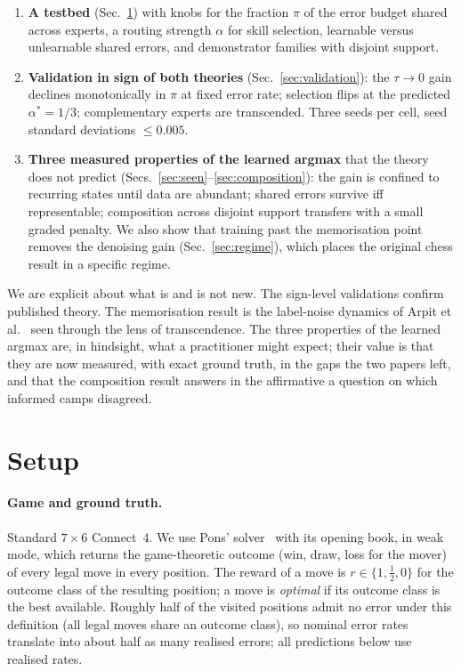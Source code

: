 \documentclass[11pt]{article}
\newcommand{\tauz}{\tau\!\to\!0}
\begin{document}
\begin{enumerate}
\item \textbf{A testbed} (Sec.~\ref{sec:setup}) with knobs for the fraction $\pi$ of the error budget shared across experts, a routing strength $\alpha$ for skill selection, learnable versus unlearnable shared errors, and demonstrator families with disjoint support.
\item \textbf{Validation in sign of both theories} (Sec.~\ref{sec:validation}): the $\tauz$ gain declines monotonically in $\pi$ at fixed error rate; selection flips at the predicted $\alpha^*=1/3$; complementary experts are transcended. Three seeds per cell, seed standard deviations $\le 0.005$.
\item \textbf{Three measured properties of the learned argmax} that the theory does not predict (Secs.~\ref{sec:seen}--\ref{sec:composition}): the gain is confined to recurring states until data are abundant; shared errors survive iff representable; composition across disjoint support transfers with a small graded penalty. We also show that training past the memorisation point removes the denoising gain (Sec.~\ref{sec:regime}), which places the original chess result in a specific regime.
\end{enumerate}

We are explicit about what is and is not new. The sign-level validations confirm published theory. The memorisation result is the label-noise dynamics of Arpit et al.~\cite{arpit2017} seen through the lens of transcendence. The three properties of the learned argmax are, in hindsight, what a practitioner might expect; their value is that they are now measured, with exact ground truth, in the gaps the two papers left, and that the composition result answers in the affirmative a question on which informed camps disagreed.

\section{Setup}\label{sec:setup}

\paragraph{Game and ground truth.} Standard $7\times6$ Connect~4. We use Pons' solver~\cite{pons2019} with its opening book, in weak mode, which returns the game-theoretic outcome (win, draw, loss for the mover) of every legal move in every position. The reward of a move is $r\in\{1,\tfrac12,0\}$ for the outcome class of the resulting position; a move is \emph{optimal} if its outcome class is the best available. Roughly half of the visited positions admit no error under this definition (all legal moves share an outcome class), so nominal error rates translate into about half as many realised errors; all predictions below use realised rates.
\end{document}
